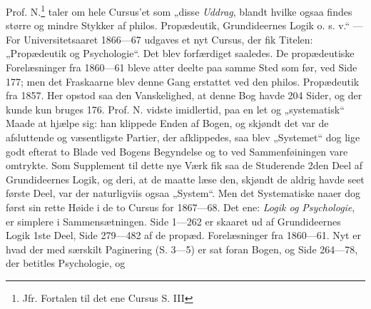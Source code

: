 \documentclass[12pt,a4paper]{book}
\newcommand{\opage}[1]{\marginnote{\footnotesize\textit{[#1]}}}
\begin{document}
Prof. N.\footnote{%
  Jfr. Fortalen til det ene Cursus S. III}
taler om hele Cursus'et som „disse \emph{Uddrag}, blandt
\opage{25} hvilke ogsaa findes større og mindre Stykker af philos. Propædeutik,
Grundideernes Logik o. s. v.“ --- For Universitetsaaret 1866---67 udgaves et nyt
Cursus, der fik Titelen: „Propædeutik og Psychologie“. Det blev forfærdiget
saaledes. De propædeutiske Forelæsninger fra 1860---61 bleve atter deelte paa
samme Sted som før, ved Side 177; men det Fraskaarne blev denne Gang erstattet
ved den philos. Propædeutik fra 1857. Her opstod saa den Vanskelighed, at denne
Bog havde 204 Sider, og der kunde kun bruges 176. Prof. N. vidste imidlertid,
paa en let og „systematisk“ Maade at hjælpe sig: han klippede Enden af Bogen, og
skjøndt det var de afsluttende og væsentligste Partier, der afklippedes, saa
blev „Systemet“ dog lige godt efterat to Blade ved Bogens Begyndelse og to ved
Sammenføiningen vare omtrykte. Som Supplement til dette nye Værk fik saa de
Studerende 2den Deel af Grundideernes Logik, og deri, at de maatte læse den,
skjøndt de aldrig havde seet første Deel, var der naturligviis ogsaa „System“.
Men det Systematiske naaer dog først sin rette Høide i de to Cursus for
1867---68. Det ene: \emph{Logik og Psychologie}, er simplere i Sammensætningen.
Side 1---262 er skaaret ud af Grundideernes Logik 1ste Deel, Side 279---482 af
de propæd. Forelæsninger fra 1860---61. Nyt er hvad der med særskilt Paginering
(S. 3---5) er sat foran Bogen, og Side 264---78, der betitles Psychologie, og
\end{document}
